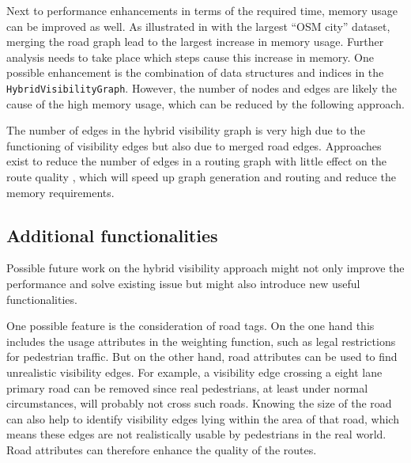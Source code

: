 		Next to performance enhancements in terms of the required time, memory usage can be improved as well.
		As illustrated in  with the largest \enquote{OSM city} dataset, merging the road graph lead to the largest increase in memory usage.
		Further analysis needs to take place which steps cause this increase in memory.
		One possible enhancement is the combination of data structures and indices in the \texttt{HybridVisibilityGraph}.
		However, the number of nodes and edges are likely the cause of the high memory usage, which can be reduced by the following approach.
		
		The number of edges in the hybrid visibility graph is very high due to the functioning of visibility edges but also due to merged road edges.
		Approaches exist to reduce the number of edges in a routing graph with little effect on the route quality \cite{aumann-reducing-routing-graph}, which will speed up graph generation and routing and reduce the memory requirements.

	\subsection{Additional functionalities}
		
		Possible future work on the hybrid visibility approach might not only improve the performance and solve existing issue but might also introduce new useful functionalities.
		
		One possible feature is the consideration of road tags.
		On the one hand this includes the usage attributes in the weighting function, such as legal restrictions for pedestrian traffic.
		But on the other hand, road attributes can be used to find unrealistic visibility edges.
		For example, a visibility edge crossing a eight lane primary road can be removed since real pedestrians, at least under normal circumstances, will probably not cross such roads.
		Knowing the size of the road can also help to identify visibility edges lying within the area of that road, which means these edges are not realistically usable by pedestrians in the real world.
		Road attributes can therefore enhance the quality of the routes.
		
